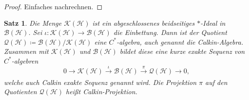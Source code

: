 \documentclass[11pt, hidelinks]{article}
\newcommand{\h}{\mathcal{H}}
\numberwithin{conj}{section}
\newtheorem{theorem}[conj]{Satz}
\begin{document}
\begin{proof}
    Einfaches nachrechnen.
\end{proof}

\begin{theorem}
Die Menge $\mathcal{K}(\h)$ ist ein abgeschlossenes beidseitiges $\ast$-Ideal in $\mathcal{B}(\h)$. Sei $\iota: \mathcal{K}(\h) \to \mathcal{B}(\h)$ die Einbettung. Dann ist der Quotient $\mathcal{Q}(\h) \coloneq \mathcal{B}(\h)/\mathcal{K}(\h)$ eine $C^\ast$-algebra, auch genannt die Calkin-Algebra. Zusammen mit $\mathcal{K}(\h)$ und $\mathcal{B}(\h)$ bildet diese eine kurze exakte Sequenz von $C^\ast$-algebren
\begin{equation}
    0 \to \mathcal{K}(\h) \xrightarrow[]{\iota} \mathcal{B}(\h) \xrightarrow[]{\pi} \mathcal{Q}(\h) \to 0,
\end{equation}
welche auch Calkin exakte Sequenz genannt wird. Die Projektion $\pi$ auf den Quotienten $\mathcal{Q}(\h)$ heißt Calkin-Projektion.
\end{theorem}
\end{document}
